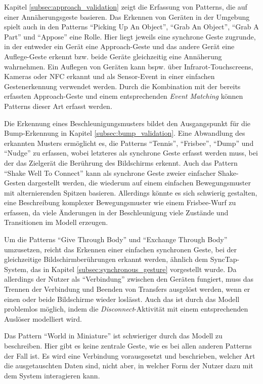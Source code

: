 Kapitel \ref{subsec:approach_validation} zeigt die Erfassung von Patterns, die auf einer Annäherungsgeste basieren. Das Erkennen von Geräten in der Umgebung spielt auch in den Patterns "`Picking Up An Object"', "`Grab An Object"', "`Grab A Part"' und "`Appose"' eine Rolle. Hier liegt jeweils eine synchrone Geste zugrunde, in der entweder ein Gerät eine Approach-Geste und das andere Gerät eine Auflege-Geste erkennt bzw. beide Geräte gleichzeitig eine Annäherung wahrnehmen. Ein Auflegen von Geräten kann bspw. über Infrarot-Touchscreens, Kameras oder NFC erkannt und als Sensor-Event in einer einfachen Gestenerkennung verwendet werden. Durch die Kombination mit der bereits erfassten Approach-Geste und einem entsprechenden \textit{Event Matching} können Patterns dieser Art erfasst werden.

Die Erkennung eines Beschleunigungsmusters bildet den Ausgangspunkt für die Bump-Erkennung in Kapitel \ref{subsec:bump_validation}. Eine Abwandlung des erkannten Musters ermöglicht es, die Patterns "`Tennis"', "`Frisbee"', "`Dump"' und "`Nudge"' zu erfassen, wobei letzteres als synchrone Geste erfasst werden muss, bei der das Zielgerät die Berührung des Bildschirms erkennt. Auch das Pattern "`Shake Well To Connect"' kann als synchrone Geste zweier einfacher Shake-Gesten dargestellt werden, die wiederum auf einem einfachen Bewegungsmuster mit alternierenden Spitzen basieren. Allerdings könnte es sich schwierig gestalten, eine Beschreibung komplexer Bewegungsmuster wie einem Frisbee-Wurf zu erfassen, da viele Änderungen in der Beschleunigung viele Zustände und Transitionen im Modell erzeugen.

Um die Patterns "`Give Through Body"' und "`Exchange Through Body"' umzusetzen, reicht das Erkennen einer einfachen synchronen Geste, bei der gleichzeitige Bildschirmberührungen erkannt werden, ähnlich dem SyncTap-System, das in Kapitel \ref{subsec:synchronous_gesture} vorgestellt wurde. Da allerdings der Nutzer als "`Verbindung"' zwischen den Geräten fungiert, muss das Trennen der Verbindung und Beenden von Transfers ausgelöst werden, wenn er einen oder beide Bildschirme wieder loslässt. Auch das ist durch das Modell problemlos möglich, indem die \textit{Disconnect}-Aktivität mit einem entsprechenden Auslöser modelliert wird.

Das Pattern "`World in Miniature"' ist schwieriger durch das Modell zu beschreiben. Hier gibt es keine zentrale Geste, wie es bei allen anderen Patterns der Fall ist. Es wird eine Verbindung vorausgesetzt und beschrieben, welcher Art die ausgetauschten Daten sind, nicht aber, in welcher Form der Nutzer dazu mit dem System interagieren kann.

